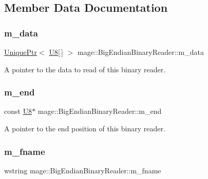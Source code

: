 \subsection{Member Data Documentation}
\hypertarget{classmage_1_1_big_endian_binary_reader_a54128bdaa233c1bd20494189b2397fe3}{}\label{classmage_1_1_big_endian_binary_reader_a54128bdaa233c1bd20494189b2397fe3} 
\subsubsection{\texorpdfstring{m\+\_\+data}{m\_data}}
{\footnotesize\ttfamily \hyperlink{namespacemage_a3316d7143a973e37adf1110f2e80ca31}{Unique\+Ptr}$<$ \hyperlink{namespacemage_afc638980bc6154f15af5e2d93a0e0ea9}{U8}\mbox{[}$\,$\mbox{]} $>$ mage\+::\+Big\+Endian\+Binary\+Reader\+::m\+\_\+data\hspace{0.3cm}{\ttfamily [private]}}

A pointer to the data to read of this binary reader. \hypertarget{classmage_1_1_big_endian_binary_reader_ab4f707d30799b98afed0f9adfc27a3e2}{}\label{classmage_1_1_big_endian_binary_reader_ab4f707d30799b98afed0f9adfc27a3e2} 
\subsubsection{\texorpdfstring{m\+\_\+end}{m\_end}}
{\footnotesize\ttfamily const \hyperlink{namespacemage_afc638980bc6154f15af5e2d93a0e0ea9}{U8}$\ast$ mage\+::\+Big\+Endian\+Binary\+Reader\+::m\+\_\+end\hspace{0.3cm}{\ttfamily [private]}}

A pointer to the end position of this binary reader. \hypertarget{classmage_1_1_big_endian_binary_reader_a0f836aec582a59f156b64bffb9653e41}{}\label{classmage_1_1_big_endian_binary_reader_a0f836aec582a59f156b64bffb9653e41} 
\subsubsection{\texorpdfstring{m\+\_\+fname}{m\_fname}}
{\footnotesize\ttfamily wstring mage\+::\+Big\+Endian\+Binary\+Reader\+::m\+\_\+fname\hspace{0.3cm}{\ttfamily [private]}}

